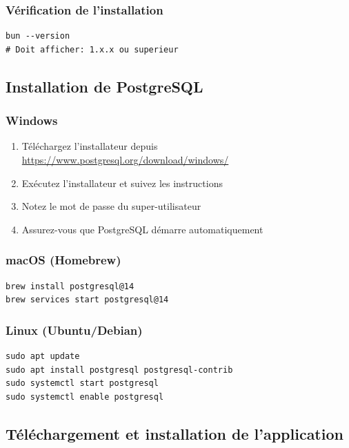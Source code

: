 \subsubsection{Vérification de l'installation}

\begin{lstlisting}[language={}, frame=single]
bun --version
# Doit afficher: 1.x.x ou superieur
\end{lstlisting}

\subsection{Installation de PostgreSQL}

\subsubsection{Windows}

\begin{enumerate}[leftmargin=*]
    \item Téléchargez l'installateur depuis \url{https://www.postgresql.org/download/windows/}
    \item Exécutez l'installateur et suivez les instructions
    \item Notez le mot de passe du super-utilisateur 
    \item Assurez-vous que PostgreSQL démarre automatiquement
\end{enumerate}

\subsubsection{macOS (Homebrew)}

\begin{lstlisting}[language={}, frame=single]
brew install postgresql@14
brew services start postgresql@14
\end{lstlisting}

\subsubsection{Linux (Ubuntu/Debian)}

\begin{lstlisting}[language={}, frame=single]
sudo apt update
sudo apt install postgresql postgresql-contrib
sudo systemctl start postgresql
sudo systemctl enable postgresql
\end{lstlisting}

\subsection{Téléchargement et installation de l'application}

